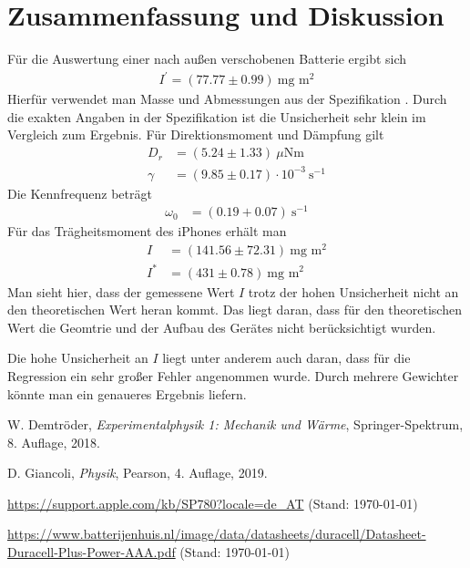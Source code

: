 \documentclass{article}
\begin{document}
\newpage
\section{Zusammenfassung und Diskussion}

Für die Auswertung einer nach außen verschobenen Batterie ergibt sich
\begin{align*}
I^\prime = (77.77 \pm 0.99)~\text{mg m}^2
\end{align*}
Hierfür verwendet man Masse und Abmessungen aus der Spezifikation \cite{duracell}. Durch die exakten Angaben in der Spezifikation ist die Unsicherheit sehr klein im Vergleich zum Ergebnis. Für Direktionsmoment und Dämpfung gilt
\begin{align}
D_r &= (5.24 \pm 1.33)~\mu\text{Nm} \\
\gamma &= (9.85 \pm 0.17)\cdot 10^{-3} ~\text{s}^{-1}
\end{align}
Die Kennfrequenz beträgt
\begin{align}
\omega_0 &= (0.19 + 0.07)~\text{s}^{-1}
\end{align}
Für das Trägheitsmoment des iPhones erhält man
\begin{align}
I &= (141.56 \pm 72.31)~\text{mg~m}^2 \\
I^* &= (431 \pm 0.78)~\text{mg~m}^2
\end{align}
Man sieht hier, dass der gemessene Wert $I$ trotz der hohen Unsicherheit nicht an den theoretischen Wert heran kommt. Das liegt daran, dass für den theoretischen Wert die Geomtrie und der Aufbau des Gerätes nicht berücksichtigt wurden.

Die hohe Unsicherheit an $I$ liegt unter anderem auch daran, dass für die Regression ein sehr großer Fehler angenommen wurde. Durch mehrere Gewichter könnte man ein genaueres Ergebnis liefern.

\begin{thebibliography}{9}
 W. Demtröder, \emph{Experimentalphysik 1: Mechanik und Wärme}, Springer-Spektrum, 8. Auflage, 2018.

 D. Giancoli, \emph{Physik}, Pearson, 4. Auflage, 2019.

 \url{https://support.apple.com/kb/SP780?locale=de_AT} (Stand: \today)

 \url{https://www.batterijenhuis.nl/image/data/datasheets/duracell/Datasheet-Duracell-Plus-Power-AAA.pdf} (Stand: \today) 

\end{thebibliography}
\end{document}
